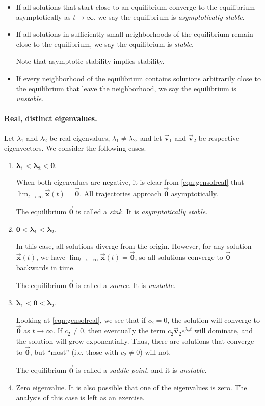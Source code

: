 \documentclass[reqno]{immbook}
\newcommand{\BV}{\vec{\textbf{v}}}
\newcommand{\BX}{\vec{\textbf{x}}}
\newcommand{\BZ}{\vec{\textbf{0}}}  %
\newcommand{\ds}{\displaystyle}
\begin{document}
\begin{itemize}
\item If all solutions that start close to an equilibrium converge
to the equilibrium asymptotically as $t\rightarrow\infty$, we
say the equilibrium is
\emph{asymptotically stable}.
\item If all solutions in sufficiently small neighborhoods
of the equilibrium remain close to the equilibrium, we say
the equilibrium is \emph{stable}.

Note that asymptotic stability implies stability.
\item If every neighborhood of the equilibrium contains solutions
arbitrarily close to the equilibrium that leave the neighborhood, we say the equilibrium is \emph{unstable}. 
\end{itemize}

\paragraph{Real, distinct eigenvalues.}
Let $\lambda_1$ and $\lambda_2$ be real eigenvalues,
$\lambda_1\ne\lambda_2$, and let $\BV_1$ and $\BV_2$
be respective eigenvectors.  We consider the following
cases.
\begin{enumerate}
\item $\pmb{\lambda_1 < \lambda_2 < 0}$.

When both eigenvalues are negative, it is clear from
\eqref{eqn:gensolreal}
that $\ds\lim_{t\rightarrow\infty}\BX(t) = \BZ$. All
trajectories approach $\BZ$ asymptotically.

The equilibrium $\BZ$ is called a \emph{sink.}
It is \emph{asymptotically stable}.

\item $\pmb{0 < \lambda_1 < \lambda _2}$.

In this case, all solutions diverge from the origin.
However, for any solution $\BX(t)$, we have
$\ds\lim_{t\rightarrow -\infty}\BX(t) = \BZ$, so all solutions 
converge to $\BZ$ backwards in time.

The equilibrium $\BZ$ is called a \emph{source.}
It is \emph{unstable}.

\item $\pmb{\lambda_1 < 0 < \lambda_2}$.

Looking at \eqref{eqn:gensolreal}, we see that if $c_2=0$, the solution
will converge to $\BZ$ as $t\rightarrow\infty$.
If $c_2\ne 0$, then eventually the term $c_2\BV_2e^{\lambda_2 t}$ will
dominate, and the solution will grow exponentially.
Thus, there are solutions that converge to $\BZ$, but ``most''
(i.e. those with $c_2\ne 0$) will not.

The equilibrium $\BZ$ is called a \emph{saddle point}, 
and it is \emph{unstable}.
\item Zero eigenvalue.  It is also possible that
one of the eigenvalues is zero.  The analysis
of this case is left as an exercise.
\end{enumerate}
\end{document}
